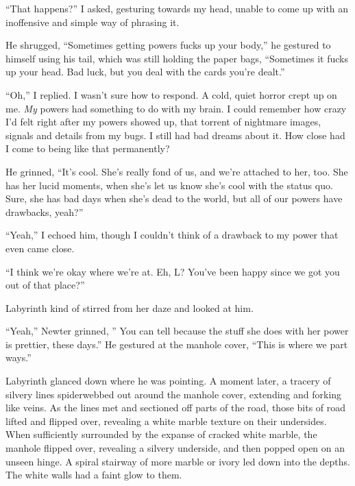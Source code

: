 ``That happens?'' I asked, gesturing towards my head, unable to come up with an inoffensive and simple way of phrasing it.



He shrugged, ``Sometimes getting powers fucks up your body,'' he gestured to himself using his tail, which was still holding the paper bags, ``Sometimes it fucks up your head.  Bad luck, but you deal with the cards you're dealt.''



``Oh,'' I replied.  I wasn't sure how to respond.  A cold, quiet horror crept up on me.  \emph{My} powers had something to do with my brain.  I could remember how crazy I'd felt right after my powers showed up, that torrent of nightmare images, signals and details from my bugs.  I still had bad dreams about it.  How close had I come to being like that permanently?



He grinned, ``It's cool.  She's really fond of us, and we're attached to her, too.  She has her lucid moments, when she's let us know she's cool with the status quo.  Sure, she has bad days when she's dead to the world, but all of our powers have drawbacks, yeah?''



``Yeah,'' I echoed him, though I couldn't think of a drawback to my power that even came close.



``I think we're okay where we're at.  Eh, L?  You've been happy since we got you out of that place?''



Labyrinth kind of stirred from her daze and looked at him.



``Yeah,'' Newter grinned, '' You can tell because the stuff she does with her power is prettier, these days.''  He gestured at the manhole cover, ``This is where we part ways.''



Labyrinth glanced down where he was pointing.  A moment later, a tracery of silvery lines spiderwebbed out around the manhole cover, extending and forking like veins.  As the lines met and sectioned off parts of the road, those bits of road lifted and flipped over, revealing a white marble texture on their undersides.  When sufficiently surrounded by the expanse of cracked white marble, the manhole flipped over, revealing a silvery underside, and then popped open on an unseen hinge.  A spiral stairway of more marble or ivory led down into the depths.  The white walls had a faint glow to them.



